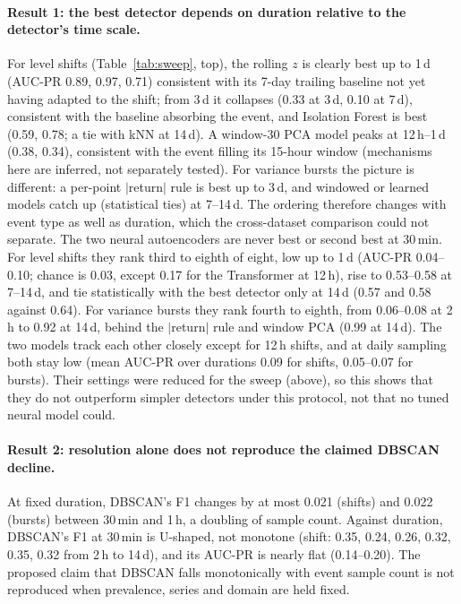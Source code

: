 \documentclass[10pt,twocolumn]{article}
\begin{document}
\paragraph{Result 1: the best detector depends on duration relative to the detector's time scale.} For level shifts (Table~\ref{tab:sweep}, top), the rolling $z$ is clearly best up to 1\,d (AUC-PR 0.89, 0.97, 0.71) consistent with its 7-day trailing baseline not yet having adapted to the shift; from 3\,d it collapses (0.33 at 3\,d, 0.10 at 7\,d), consistent with the baseline absorbing the event, and Isolation Forest is best (0.59, 0.78; a tie with kNN at 14\,d). A window-30 PCA model peaks at 12\,h--1\,d (0.38, 0.34), consistent with the event filling its 15-hour window (mechanisms here are inferred, not separately tested). For variance bursts the picture is different: a per-point $|$return$|$ rule is best up to 3\,d, and windowed or learned models catch up (statistical ties) at 7--14\,d. The ordering therefore changes with event type as well as duration, which the cross-dataset comparison could not separate. The two neural autoencoders are never best or second best at 30\,min. For level shifts they rank third to eighth of eight, low up to 1\,d (AUC-PR 0.04--0.10; chance is 0.03, except 0.17 for the Transformer at 12\,h), rise to 0.53--0.58 at 7--14\,d, and tie statistically with the best detector only at 14\,d (0.57 and 0.58 against 0.64). For variance bursts they rank fourth to eighth, from 0.06--0.08 at 2\,h to 0.92 at 14\,d, behind the $|$return$|$ rule and window PCA (0.99 at 14\,d). The two models track each other closely except for 12\,h shifts, and at daily sampling both stay low (mean AUC-PR over durations 0.09 for shifts, 0.05--0.07 for bursts). Their settings were reduced for the sweep (above), so this shows that they do not outperform simpler detectors under this protocol, not that no tuned neural model could.

\paragraph{Result 2: resolution alone does not reproduce the claimed DBSCAN decline.} At fixed duration, DBSCAN's F1 changes by at most 0.021 (shifts) and 0.022 (bursts) between 30\,min and 1\,h, a doubling of sample count. Against duration, DBSCAN's F1 at 30\,min is U-shaped, not monotone (shift: 0.35, 0.24, 0.26, 0.32, 0.35, 0.32 from 2\,h to 14\,d), and its AUC-PR is nearly flat (0.14--0.20). The proposed claim that DBSCAN falls monotonically with event sample count is not reproduced when prevalence, series and domain are held fixed.
\end{document}
